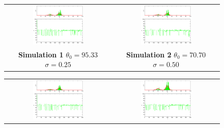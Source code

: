 \begin{figure}\label{fig: SimulationMetropolis0}
\begin{tabular}{cc} 
\includegraphics[width=0.5\textwidth]{ImaginiLatex/MetropolisExample1.eps} &
\includegraphics[width=0.5\textwidth]{ImaginiLatex/MetropolisExample2.eps} \\
\textbf{Simulation 1} $\theta_0=   95.33$  $\sigma=    0.25$  & \textbf{Simulation 2} $\theta_0=   70.70$  $\sigma=    0.50$
\end{tabular}
\begin{tabular}{cc} 
\includegraphics[width=0.5\textwidth]{ImaginiLatex/MetropolisExample3.eps} &
\includegraphics[width=0.5\textwidth]{ImaginiLatex/MetropolisExample4.eps} \\

\end{tabular}
\end{figure}
